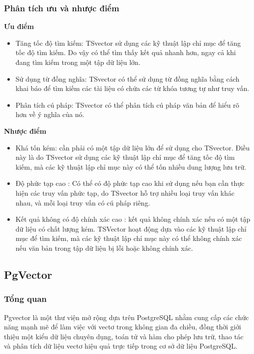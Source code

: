 \subsubsection{Phân tích ưu và nhược điểm}
\textbf{Ưu điểm}
\begin{itemize}
    \item Tăng tốc độ tìm kiếm: TSvector sử dụng các kỹ thuật lập chỉ mục để tăng tốc độ tìm kiếm. Do vậy có thể tìm thấy kết quả nhanh hơn, ngay cả khi đang tìm kiếm trong một tập dữ liệu lớn.
    \item Sử dụng từ đồng nghĩa: TSvector có thể sử dụng từ đồng nghĩa bằng cách khai báo để tìm kiếm các tài liệu có chứa các từ khóa tương tự như truy vấn.
    \item Phân tích cú pháp: TSvector có thể phân tích cú pháp văn bản để hiểu rõ hơn về ý nghĩa của nó.
\end{itemize}
\textbf{Nhược điểm}
\begin{itemize}
    \item Khá tốn kém: cần phải có một tập dữ liệu lớn để sử dụng cho TSvector. Điều này là do TSvector sử dụng các kỹ thuật lập chỉ mục để tăng tốc độ tìm kiếm, mà các kỹ thuật lập chỉ mục này có thể tốn nhiều dung lượng lưu trữ.
    \item Độ phức tạp cao : Có thể có độ phức tạp cao khi sử dụng nếu bạn cần thực hiện các truy vấn phức tạp, do TSvector hỗ trợ nhiều loại truy vấn khác nhau, và mỗi loại truy vấn có cú pháp riêng.
    \item Kết quả không có độ chính xác cao : kết quả không chính xác nếu có một tập dữ liệu có chất lượng kém. TSVector hoạt động dựa vào các kỹ thuật lập chỉ mục để tìm kiếm, mà các kỹ thuật lập chỉ mục này có thể không chính xác nếu văn bản trong tập dữ liệu bị lỗi hoặc không chính xác.
\end{itemize}
\subsection{PgVector}
\subsubsection{Tổng quan}
Pgvector là một thư viện mở rộng dựa trên PostgreSQL nhằm cung cấp các chức năng mạnh mẽ để làm việc với vectơ trong không gian đa chiều, đồng thời giới thiệu một kiểu dữ liệu chuyên dụng, toán tử và hàm cho phép lưu trữ, thao tác và phân tích dữ liệu vectơ hiệu quả trực tiếp trong cơ sở dữ liệu PostgreSQL.
